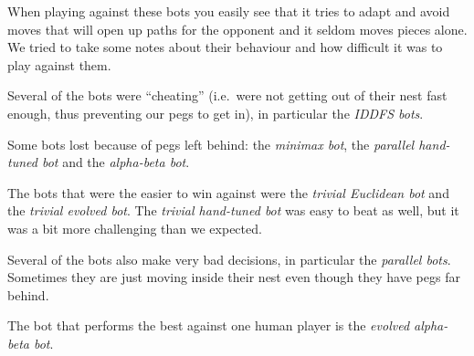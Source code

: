 When playing against these bots you easily see that it tries to adapt and avoid
moves that will open up paths for the opponent and it seldom moves pieces alone.
We tried to take some notes about their
behaviour and how difficult it was to play against them.

Several of the bots were ``cheating'' (i.e.~were not getting out of their
nest fast enough, thus preventing our pegs to get in), in particular the
\textit{IDDFS bots}.

Some bots lost because of pegs left behind: the \textit{minimax bot}, the
\textit{parallel hand-tuned bot} and the \textit{alpha-beta bot}.

The bots that were the easier to win against were the \textit{trivial Euclidean bot} and
the \textit{trivial evolved bot}. The \textit{trivial hand-tuned bot} was easy
to beat as well, but it was a bit more challenging than we expected.

Several of the bots also make very bad decisions, in particular the
\textit{parallel bots}. Sometimes they are just moving inside their
nest even though they have pegs far behind.

The bot that performs the best against one human player is the
\textit{evolved alpha-beta bot}.
